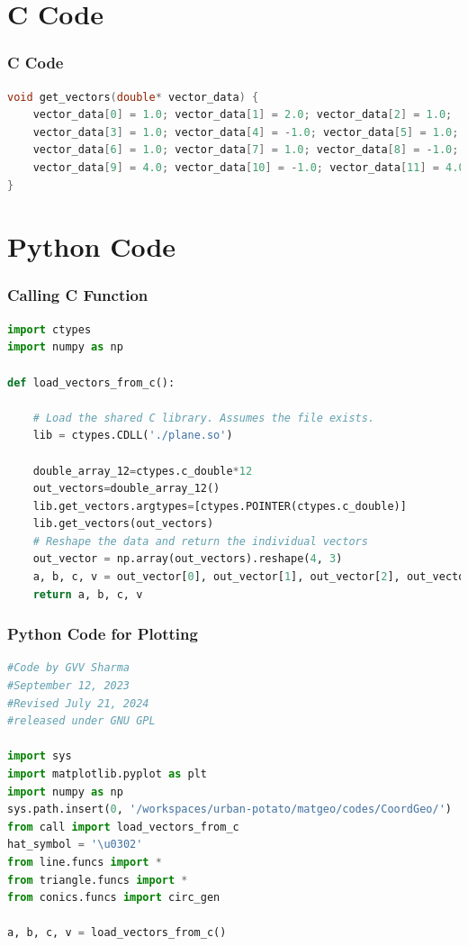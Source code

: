 \documentclass{beamer}
\theoremstyle{remark}
\numberwithin{equation}{section}
\begin{document}
\section{C Code}
\begin{frame}[fragile]
\frametitle{C Code}
\begin{lstlisting}[language=C]
void get_vectors(double* vector_data) {
    vector_data[0] = 1.0; vector_data[1] = 2.0; vector_data[2] = 1.0;
    vector_data[3] = 1.0; vector_data[4] = -1.0; vector_data[5] = 1.0;
    vector_data[6] = 1.0; vector_data[7] = 1.0; vector_data[8] = -1.0;
    vector_data[9] = 4.0; vector_data[10] = -1.0; vector_data[11] = 4.0;
}
    \end{lstlisting}
\end{frame}
\section{Python Code}
\begin{frame}[fragile]
\frametitle{Calling C Function}
\begin{lstlisting}[language=Python]
import ctypes
import numpy as np

def load_vectors_from_c():

    # Load the shared C library. Assumes the file exists.
    lib = ctypes.CDLL('./plane.so')

    double_array_12=ctypes.c_double*12
    out_vectors=double_array_12()
    lib.get_vectors.argtypes=[ctypes.POINTER(ctypes.c_double)]
    lib.get_vectors(out_vectors)
    # Reshape the data and return the individual vectors
    out_vector = np.array(out_vectors).reshape(4, 3)
    a, b, c, v = out_vector[0], out_vector[1], out_vector[2], out_vector[3]
    return a, b, c, v
\end{lstlisting}
\end{frame}

\begin{frame}[fragile]
\frametitle{Python Code for Plotting}
\begin{lstlisting}[language=Python]
#Code by GVV Sharma
#September 12, 2023
#Revised July 21, 2024
#released under GNU GPL

import sys
import matplotlib.pyplot as plt
import numpy as np
sys.path.insert(0, '/workspaces/urban-potato/matgeo/codes/CoordGeo/') 
from call import load_vectors_from_c
hat_symbol = '\u0302'
from line.funcs import *
from triangle.funcs import *
from conics.funcs import circ_gen

a, b, c, v = load_vectors_from_c()
 
\end{lstlisting}
\end{frame}
\end{document}
